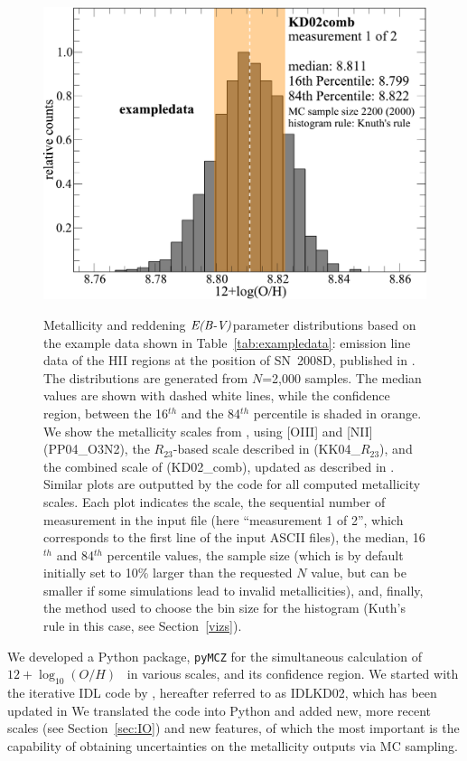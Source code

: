 \documentclass{emulateapj}
\newcommand{\oxabinline}{\ensuremath{12 + \log_{10}(O/H)}}
\newcommand{\ebmv}{\ensuremath{\mathrm{\emph{E(B-V)}}}}
\begin{document}
\begin{figure}[!ht]
{\includegraphics[width=0.98\columnwidth]{exampledata_n2000_KD02comb_1.pdf}}
\caption{Metallicity and reddening \ebmv parameter distributions based on the example data shown in Table~\ref{tab:exampledata}: emission line data of the HII regions at the position of SN~2008D, published in \citet{modjaz11}. The distributions are generated from $N$=2,000 samples. The median values are shown with dashed white lines, while the confidence region, between the 16$^{th}$ and the 84$^{th}$ percentile is shaded in orange. We show the metallicity scales from \citet{pettini04}, using [OIII] and [NII]  (PP04\_O3N2), the $R_{23}$-based scale described in \citet{kobulnicky04} (KK04\_$R_{23}$), and the combined scale of \citet{kewley02} (KD02\_comb), updated as described in \citet{kewley08}. Similar plots are outputted by the code for all computed metallicity scales. Each plot indicates the scale, the sequential number of measurement in the input file (here ``measurement 1 of 2'', which corresponds to the first line of the input ASCII files), the median, 16$^{th}$  and 84$^{th}$ percentile values, the sample size (which is by default initially set to 10\% larger than the requested $N$ value, but can be smaller if some simulations lead to invalid metallicities), and, finally, the method used to choose the bin size for the histogram (Kuth's rule in this case, see Section~\ref{vizs}).}
 \label{metallicity_distribution}
\end{figure}


We developed a Python package, \verb=pyMCZ= for the simultaneous calculation of \oxabinline~ in various scales, and its confidence region.
We started with the iterative IDL code by \citet{kewley02}, hereafter referred to as IDLKD02, which has been updated in \citet{kewley08} %
We translated the code into Python and added new, more recent scales (see Section~\ref{sec:IO}) and new features, of which the most important is the capability of obtaining uncertainties on the metallicity outputs via MC sampling. 
\end{document}
